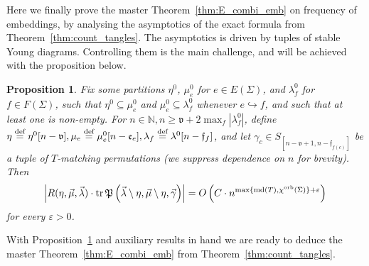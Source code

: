 \documentclass{amsart}
\newtheorem{proposition}[conjecture]{Proposition}
\newcommand{\cho}{\chi^{\textnormal{orb}}}
\newcommand{\defeq}{\stackrel{\tn{def}}{=}}
\newcommand{\md}{\textnormal{md}}
\newcommand{\tn}{\textnormal}
\newcommand{\tr}{\operatorname{tr}}
\begin{document}
Here we finally prove the master Theorem~\ref{thm:E_combi_emb} on frequency of embeddings, by analysing the asymptotics of the exact formula from Theorem~\ref{thm:count_tangles}. The asymptotics is driven by tuples of stable Young diagrams. Controlling them is the main challenge, and will be achieved with the proposition below.
\begin{proposition}\label{prop:long_bd}
Fix some partitions $\eta^0$, $\mu^0_e$ for $e\in E(\Sigma)$, and $\lambda_f^0$ for $f\in F(\Sigma)$, such that $\eta^0\subseteq\mu^0_e$ and $\mu^0_e\subseteq\lambda^0_f$ whenever $e\hookrightarrow f$, and such that at least one is non-empty. For $n\in\mathbb{N},n\geqslant\mathfrak{v}+2\max_f|\lambda^0_f|$, define $\eta\defeq\eta^0[n-\mathfrak{v}],\mu_e\defeq\mu^0_e[n-\mathfrak{e}_e],\lambda_f\defeq\lambda^0[n-\mathfrak{f}_f]$, and let $\gamma_c\in S_{[n-\mathfrak{v}+1,n-\mathfrak{f}_{f(c)}]}$ be a tuple of $T$-matching permutations (we suppress dependence on $n$ for brevity). Then
\begin{equation*}
\left|R(\eta,\vec\mu,\vec\lambda)\cdot\tr\mathfrak{P}\left(\vec\lambda\setminus\eta,\vec\mu\setminus\eta,\vec\gamma\right)\right|=O\left(C\cdot n^{\max\{\md(T),\cho(\Sigma)\}+\varepsilon}\right)
\end{equation*}
for every $\varepsilon>0$.
\end{proposition}
With Proposition~\ref{prop:long_bd} and auxiliary results in hand we are ready to deduce the master Theorem~\ref{thm:E_combi_emb} from Theorem~\ref{thm:count_tangles}.
\end{document}
